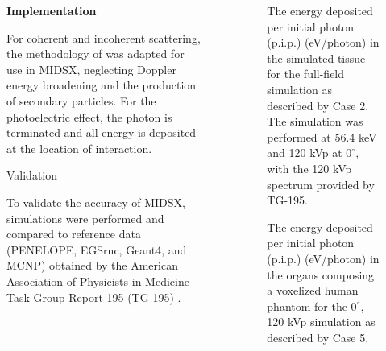 \documentclass[final]{beamer}
\newlength{\sepwidth}
\newlength{\colwidth}
\newcommand{\separatorcolumn}{\begin{column}{\sepwidth}\end{column}}
\newcommand\zz[2][\colwidth]{\resizebox{\colwidth}{!}{}}
\begin{document}
\begin{frame}[t]
\begin{columns}[t]
\begin{column}{\colwidth}
  \begin{center}
    \textbf{Implementation}
  \end{center}

  For coherent and incoherent scattering, the methodology of \cite{lund2018implementation} was adapted for use in MIDSX, neglecting Doppler energy broadening and the production of secondary particles. For the photoelectric effect, the photon is terminated and all energy is deposited at the location of interaction.

  \begin{block}{Validation}

    To validate the accuracy of MIDSX, simulations were performed and compared to reference data (PENELOPE, EGSrnc, Geant4, and MCNP) obtained by the American Association of Physicists in Medicine Task Group Report 195 (TG-195) \cite{sechopoulos_monte_2015}.

  \end{block}

\end{column}

\separatorcolumn

\begin{column}{\colwidth}

  \vspace{-2\baselineskip}  
\begin{figure}[htbp]
  \hspace*{8mm} %
  \centering
  \zz{radiography_body_dep_poster_ready}
  \caption{The energy deposited per initial photon (p.i.p.) (eV/photon) in the simulated tissue for the full-field simulation as described by Case 2. The simulation was performed at 56.4 keV and 120 kVp at $0^\circ$, with the 120 kVp spectrum provided by TG-195.}
  \label{fig:BDGraph}
\end{figure}


    \begin{figure}
      \centering
    \zz{CT_120_0_big_font}
    \caption{The energy deposited per initial photon (p.i.p.) (eV/photon) in the organs composing a voxelized human phantom for the $0^\circ$, 120 kVp simulation as described by Case 5.}
    \label{fig:CTGraph}
    \end{figure}
  


\end{column}
\end{columns}
\end{frame}
\end{document}
